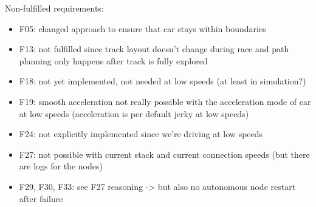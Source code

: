 Non-fulfilled requirements:
\begin{itemize}
	\item F05: changed approach to ensure that car stays within boundaries
	\item F13: not fulfilled since track layout doesn't change during race and path planning only happens after track is fully explored
	\item F18: not yet implemented, not needed at low speeds (at least in simulation?)
	\item F19: smooth acceleration not really possible with the acceleration mode of car at low speeds (acceleration is per default jerky at low speeds)
	\item F24: not explicitly implemented since we're driving at low speeds
	\item F27: not possible with current stack and current connection speeds (but there are logs for the nodes)
	\item F29, F30, F33: see F27 reasoning -> but also no autonomous node restart after failure
\end{itemize}